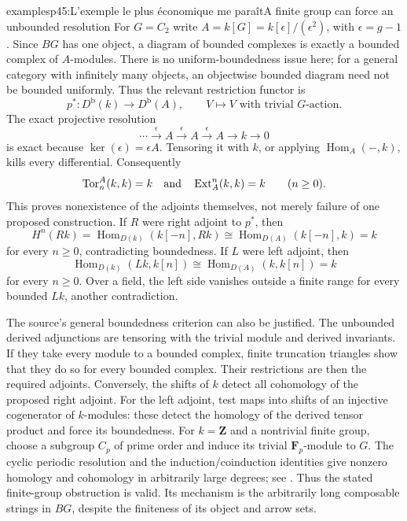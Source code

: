 \begin{dcomment}{examples}{p45:L'exemple le plus économique me paraît}{A finite group can force an unbounded resolution}
For $G=C_2$ write $A=k[G]=k[\epsilon]/(\epsilon^2)$, with $\epsilon=g-1$. Since $BG$ has one object, a diagram of bounded complexes is exactly a bounded complex of $A$-modules. There is no uniform-boundedness issue here; for a general category with infinitely many objects, an objectwise bounded diagram need not be bounded uniformly. Thus the relevant restriction functor is
\[
 p^*:D^{\mathrm b}(k)\longrightarrow D^{\mathrm b}(A),
 \qquad V\longmapsto V\text{ with trivial }G\text{-action}.
\]
The exact projective resolution
\[
 \cdots\xrightarrow{\epsilon}A\xrightarrow{\epsilon}A
 \xrightarrow{\epsilon}A\longrightarrow k\longrightarrow0
\]
is exact because $\ker(\epsilon)=\epsilon A$. Tensoring it with $k$, or applying $\operatorname{Hom}_A(-,k)$, kills every differential. Consequently
\[
 \operatorname{Tor}^{A}_n(k,k)=k
 \quad\hbox{and}\quad
 \operatorname{Ext}^{n}_A(k,k)=k\qquad(n\geq0).
\]
This proves nonexistence of the adjoints themselves, not merely failure of one proposed construction. If $R$ were right adjoint to $p^*$, then
\[
 H^n(Rk)=\operatorname{Hom}_{D(k)}(k[-n],Rk)
 \cong\operatorname{Hom}_{D(A)}(k[-n],k)=k
\]
for every $n\geq0$, contradicting boundedness. If $L$ were left adjoint, then
\[
 \operatorname{Hom}_{D(k)}(Lk,k[n])
 \cong\operatorname{Hom}_{D(A)}(k,k[n])=k
\]
for every $n\geq0$. Over a field, the left side vanishes outside a finite range for every bounded $Lk$, another contradiction.

The source's general boundedness criterion can also be justified. The unbounded derived adjunctions are tensoring with the trivial module and derived invariants. If they take every module to a bounded complex, finite truncation triangles show that they do so for every bounded complex. Their restrictions are then the required adjoints. Conversely, the shifts of $k$ detect all cohomology of the proposed right adjoint. For the left adjoint, test maps into shifts of an injective cogenerator of $k$-modules: these detect the homology of the derived tensor product and force its boundedness. For $k=\mathbf Z$ and a nontrivial finite group, choose a subgroup $C_p$ of prime order and induce its trivial $\mathbf F_p$-module to $G$. The cyclic periodic resolution and the induction/coinduction identities give nonzero homology and cohomology in arbitrarily large degrees; see \citet[Lecture~3]{BrownCohomologyLectures}. Thus the stated finite-group obstruction is valid. Its mechanism is the arbitrarily long composable strings in $BG$, despite the finiteness of its object and arrow sets.
\end{dcomment}

